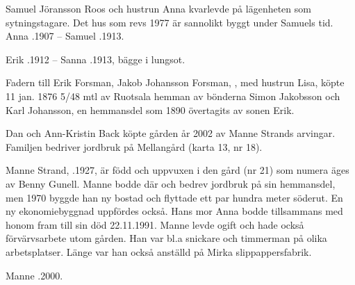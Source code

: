 Samuel Jöransson Roos och hustrun Anna kvarlevde på lägenheten som sytningstagare. Det hus som revs 1977 är sannolikt byggt under Samuels tid. Anna .1907  --  Samuel .1913.

Erik .1912  --  Sanna .1913, bägge i lungsot.


Fadern till Erik Forsman, Jakob Johansson Forsman, , med hustrun Lisa,  köpte 11 jan. 1876  5/48 mtl av Ruotsala hemman av bönderna Simon Jakobsson och Karl Johansson, en hemmansdel som 1890 övertagits av sonen Erik.\jhvspace{}






Dan och Ann-Kristin Back köpte gården år 2002 av Manne Strands arvingar. Familjen bedriver jordbruk på Mellangård (karta 13, nr 18).\jhvspace{}


Manne Strand, .1927, är född och uppvuxen i den gård (nr 21) som numera äges av Benny Gunell. Manne bodde där och bedrev jordbruk på sin hemmansdel, men 1970 byggde han ny bostad och flyttade ett  par hundra meter söderut. En ny ekonomiebyggnad uppfördes också. Hans mor Anna bodde tillsammans med honom fram till sin död 22.11.1991. Manne levde ogift och hade också förvärvsarbete utom gården. Han var bl.a snickare och timmerman på olika arbetsplatser. Länge var han också anställd på Mirka slippappersfabrik.

Manne .2000.
